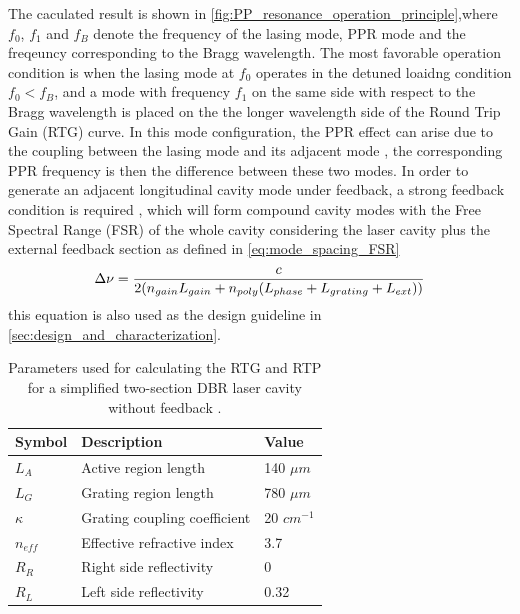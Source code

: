 The caculated result is shown in \autoref{fig:PP_resonance_operation_principle},where $f_0$, $f_1$ and $f_B$ denote the frequency of the lasing mode, PPR mode and the freqeuncy corresponding to the Bragg wavelength. The most favorable operation condition is when the lasing mode at $f_0$ operates in the detuned loaidng condition $f_0<f_B$, and a mode with frequency $f_1$ on the same side with respect to the Bragg wavelength is placed on the the longer wavelength side of the Round Trip Gain (RTG) curve. In this mode configuration, the PPR effect can arise due to the coupling between the lasing mode and its adjacent mode \cite{montrosset2014laser}, the corresponding PPR frequency is then the difference between these two modes. In order to generate an adjacent longitudinal cavity mode under feedback, a strong feedback condition is required \cite{mieda2016ultra,ahmed2013enhancing, morthier2000extended,bornholdt200840}, which will form compound cavity modes with the Free Spectral Range (FSR) of the whole cavity considering the laser cavity plus the external feedback section as defined in \autoref{eq:mode_spacing_FSR} \cite{coldren2012diode}
\begin{equation}
    \Delta\nu=\frac{c}{2\qty(n_{gain}L_{gain}+n_{poly}\qty(L_{phase}+L_{grating}+L_{ext}))}
    \label{eq:mode_spacing_FSR}
\end{equation}
this equation is also used as the design guideline in \autoref{sec:design_and_characterization}.

\begin{table}[ht]
    \centering
    \caption{Parameters used for calculating the RTG and RTP for a simplified two-section DBR laser cavity without feedback \cite{montrosset2014laser}.}
    \label{tab:PP_resonance_operation_principle}
    \begin{tabular}{@{}lll@{}}
    \toprule
    Symbol    & Description                  & Value        \\ \midrule
    $L_A$     & Active region length         & 140 $\mu m$  \\
    $L_G$     & Grating region length        & 780 $\mu m$  \\
    $\kappa$  & Grating coupling coefficient & 20 $cm^{-1}$ \\
    $n_{eff}$ & Effective refractive index   & 3.7          \\
    $R_R$     & Right side reflectivity      & 0            \\
    $R_L$     & Left side reflectivity       & 0.32         \\ \bottomrule
    \end{tabular}
\end{table}

